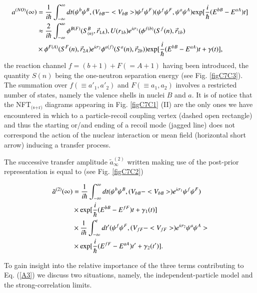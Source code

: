 \begin{subappendices}
\begin{equation}\label{eq7.C.6}
\begin{split}
a^{(NO)} (\infty) &= \frac{1}{i \hbar} \int^{\infty}_{-\infty} dt (\psi^b \psi^B, (V_{bB} - <V_{bB}>) \psi^f \psi^F )
(\psi^f\psi^F, \psi^a \psi^A) 
{\rm exp} [\frac{i}{\hbar} (E^{bB} - E^{aA}) t]    \\
&\approx \frac{2}{i \hbar} \int^{\infty}_{- \infty} \phi^{B(F)} (S^B_{(n)}, \vec r_{1A}), U(r_{1b}) 
e^{i \sigma_1}
(\phi^{f(b)}(S^f(n), \vec r_{1b})\\
&  \times\phi^{F(A)} (S^F(n),\vec r_{2A}) e^{i \sigma_2} \phi^{a(f)}(S^a(n),\vec r_{2b})) {\rm exp} [\frac{i}{\hbar} (E^{bB} - E^{aA}) t + \gamma(t)] ,
\end{split}
\end{equation}
the reaction channel $f= (b+1) + F(=A+1)$ having been introduced, the quantity $S(n)$ being the one-neutron separation 
energy (see Fig. \ref{figC7C3}). The summation over $f(\equiv a'_1,a'_2)$ and $F (\equiv a_1,a_2)$ involves a restricted number of states, namely the valence shells in nuclei $B$ and $a$. It is of notice that the NFT$_{\text{(s+r)}}$ diagrams appearing in Fig. \ref{figC7C1} (II) are the only ones we have encountered in which to a particle-recoil coupling vertex (dashed open rectangle) and thus the starting or/and ending of a recoil mode (jagged line) does not correspond the action of the nuclear interaction or mean field (horizontal short arrow) inducing a transfer process. 

The successive transfer amplitude  $\tilde a^{(2)}_{\infty}$ written making use of the post-prior representation is equal to 
(see Fig. \ref{figC7C2})

\begin{align}\label{eqC7C7}
\nonumber \tilde a^{(2)} (\infty) & = \frac{1}{i \hbar} \int^{\infty}_{-\infty} dt (\psi^b \psi^B, (V_{bB} - <V_{bB}>) e^{i \sigma_1} \psi^f \psi^F )\\
 \nonumber &\times {\rm exp} [\frac{i}{\hbar} (E^{bB} - E^{fF}) t + \gamma_1(t)]   \\
\nonumber &\times \frac{1}{i \hbar} \int^{t}_{-\infty} dt' (\psi^f \psi^F, (V_{fF} - <V_{fF}>) e^{i \sigma_2} \psi^a \psi^A > \\
&\times {\rm exp} [\frac{i}{\hbar} (E^{fF} - E^{aA}) t' + \gamma_2(t')].
\end{align}

To gain insight into the  relative importance of the three terms contributing to Eq. (\ref{A3}) we discuss two situations, namely,
the independent-particle model and the strong-correlation limits. 



\end{subappendices}
